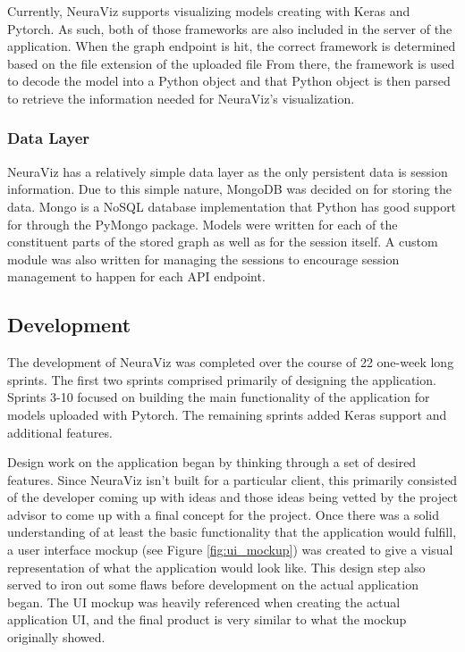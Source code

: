 Currently, NeuraViz supports visualizing models creating with Keras and Pytorch. As such, both of those frameworks are also included in the server of the application. When the graph endpoint is hit, the correct framework is determined based on the file extension of the uploaded file From there, the framework is used to decode the model into a Python object and that Python object is then parsed to retrieve the information needed for NeuraViz's visualization.

\subsubsection{Data Layer}
NeuraViz has a relatively simple data layer as the only persistent data is session information. Due to this simple nature, MongoDB \cite{mongodb} was decided on for storing the data. Mongo is a NoSQL database implementation that Python has good support for through the PyMongo package. \cite{pymongo} Models were written for each of the constituent parts of the stored graph as well as for the session itself. A custom module was also written for managing the sessions to encourage session management to happen for each API endpoint.

\subsection{Development}
The development of NeuraViz was completed over the course of 22 one-week long sprints. The first two sprints comprised primarily of designing the application. Sprints 3-10 focused on building the main functionality of the application for models uploaded with Pytorch. The remaining sprints added Keras support and additional features.

Design work on the application began by thinking through a set of desired features. Since NeuraViz isn't built for a particular client, this primarily consisted of the developer coming up with ideas and those ideas being vetted by the project advisor to come up with a final concept for the project. Once there was a solid understanding of at least the basic functionality that the application would fulfill, a user interface mockup (see Figure \ref{fig:ui_mockup}) was created to give a visual representation of what the application would look like. This design step also served to iron out some flaws before development on the actual application began. The UI mockup was heavily referenced when creating the actual application UI, and the final product is very similar to what the mockup originally showed.

